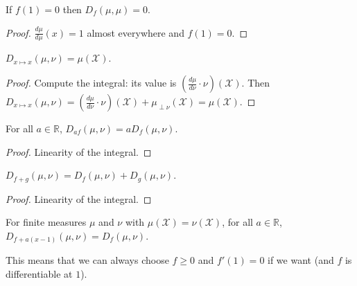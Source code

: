 \begin{lemma}
  \label{lem:fDiv_self}
  \leanok
  If $f(1) = 0$ then $D_{f}(\mu, \mu) = 0$.
\end{lemma}

\begin{proof} \leanok
$\frac{d \mu}{d \mu}(x) = 1$ almost everywhere and $f(1) = 0$.
\end{proof}

\begin{lemma}
  \label{lem:fDiv_id}
  \leanok
  $D_{x \mapsto x}(\mu, \nu) = \mu(\mathcal X)$.
\end{lemma}

\begin{proof} \leanok
Compute the integral: its value is $(\frac{d\mu}{d\nu}\cdot \nu)(\mathcal X)$. Then
$D_{x\mapsto x}(\mu, \nu) = (\frac{d\mu}{d\nu}\cdot \nu)(\mathcal X) + \mu_{\perp \nu}(\mathcal X) = \mu (\mathcal X)$.
\end{proof}

\begin{lemma}
  \label{lem:fDiv_mul}
  \leanok
  For all $a \in \mathbb{R}$, $D_{a f}(\mu, \nu) = a D_{f}(\mu, \nu)$.
\end{lemma}

\begin{proof}
Linearity of the integral.
\end{proof}

\begin{lemma}
  \label{lem:fDiv_add}
  \leanok
  $D_{f + g}(\mu, \nu) = D_f(\mu, \nu) + D_g(\mu, \nu)$.
\end{lemma}

\begin{proof}
Linearity of the integral.
\end{proof}

\begin{lemma}
  \label{lem:fDiv_add_linear}
  \leanok
  For finite measures $\mu$ and $\nu$ with $\mu(\mathcal X) = \nu(\mathcal X)$, for all $a \in \mathbb{R}$, $D_{f + a(x - 1)}(\mu, \nu) = D_{f}(\mu, \nu)$.
\end{lemma}

This means that we can always choose $f \ge 0$ and $f'(1) = 0$ if we want (and $f$ is differentiable at $1$).

